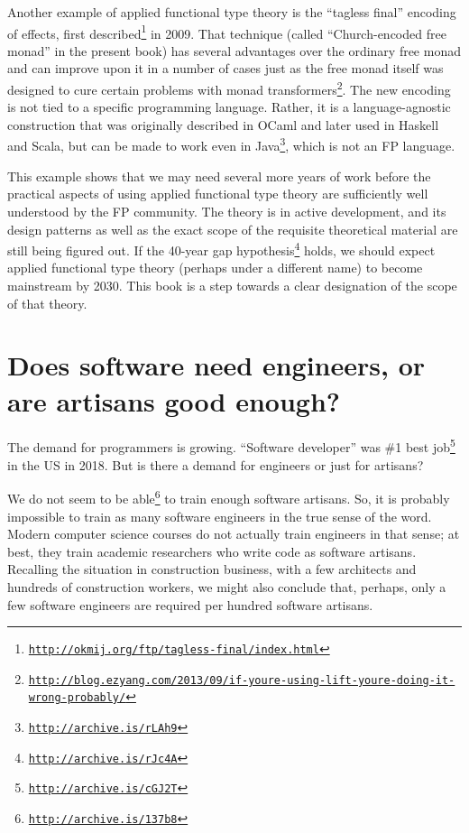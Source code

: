 Another example of applied functional type theory is the  \textsf{``}tagless
final\textsf{''} encoding of effects, first described\footnote{\texttt{\href{http://okmij.org/ftp/tagless-final/index.html}{http://okmij.org/ftp/tagless-final/index.html}}}
in 2009. That technique (called \textsf{``}Church-encoded free monad\textsf{''} in
the present book) has several advantages over the ordinary free monad
and can improve upon it in a number of cases \textemdash{} just as
the free monad itself was designed to cure certain problems with monad
transformers\footnote{\texttt{\href{http://blog.ezyang.com/2013/09/if-youre-using-lift-youre-doing-it-wrong-probably/}{http://blog.ezyang.com/2013/09/if-youre-using-lift-youre-doing-it-wrong-probably/}}}.
The new encoding is not tied to a specific programming language. Rather,
it is a language-agnostic construction that was originally described
in OCaml and later used in Haskell and Scala, but can be made to work
even in Java\footnote{\texttt{\href{http://archive.is/rLAh9}{http://archive.is/rLAh9}}},
which is not an FP language.

This example shows that we may need several more years of work before
the practical aspects of using applied functional type theory are
sufficiently well understood by the FP community. The theory is in
active development, and its design patterns \textemdash{} as well
as the exact scope of the requisite theoretical material \textemdash{}
are still being figured out. If the 40-year gap hypothesis\footnote{\texttt{\href{http://archive.is/rJc4A}{http://archive.is/rJc4A}}}
holds, we should expect applied functional type theory (perhaps under
a different name) to become mainstream by 2030. This book is a step
towards a clear designation of the scope of that theory.

\section{Does software need engineers, or are artisans good enough? }

The demand for programmers is growing. \textsf{``}Software developer\textsf{''} was
\#1 best job\footnote{\texttt{\href{http://archive.is/cGJ2T}{http://archive.is/cGJ2T}}}
in the US in 2018. But is there a demand for engineers or just for
artisans?

We do not seem to be able\footnote{\texttt{\href{http://archive.is/137b8}{http://archive.is/137b8}}}
to train enough software artisans. So, it is probably impossible to
train as many software engineers in the true sense of the word. Modern
computer science courses do not actually train engineers in that sense;
at best, they train academic researchers who write code as software
artisans. Recalling the situation in construction business, with a
few architects and hundreds of construction workers, we might also
conclude that, perhaps, only a few software engineers are required
per hundred software artisans.

